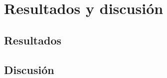 \newpage\mbox{}\thispagestyle{empty}

\chapter{Resultados y discusión}

\section{Resultados}

\section{Discusión}





